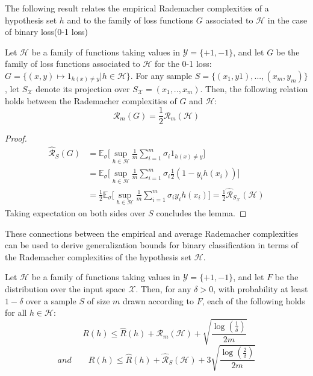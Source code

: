 The following result relates the empirical Rademacher complexities of a hypothesis set $h$ and to the family of loss functions $G$ associated to $\mathcal{H}$ in the case of binary loss(0-1 loss)
\begin{lemma}
	Let $\mathcal{H}$ be a family of functions taking values in $\mathcal{Y}=\{+1,-1\}$, and let $G$ be the family of loss functions associated to $\mathcal{H}$ for the 0-1 loss:$G=\{(x,y) \mapsto 1_{h(x)\ne y} | h\in \mathcal{H}\}$.
	For any sample $S=\{(x_1, y1),..., (x_m, y_m)\}$, let $S_{\mathcal{X}}$ denote its projection over $S_{\mathcal{X}}=(x_1,.., x_m)$. Then, the following relation holds
	between the Rademacher complexities of $G$ and $\mathcal{H}$:
	\begin{equation}
	\mathcal{R}_m(G)=\frac{1}{2} \mathcal{R}_m(\mathcal{H})
	\end{equation}
\end{lemma}
\begin{proof}
	\begin{align}
	\hat{\mathcal{R}}_S(G)&= \mathbb{E}_{\sigma} \big[\sup_{h\in \mathcal{H}}\frac{1}{m}\sum_{i=1}^{m}\sigma_i1_{h(x)\ne y}\big]\\
	&=\mathbb{E}_{\sigma} \big[\sup_{h\in \mathcal{H}}\frac{1}{m}\sum_{i=1}^{m}\sigma_i\frac{1}{2}(1-y_ih(x_i))\big]\\
	&= \frac{1}{2} \mathbb{E}_{\sigma} \big[\sup_{h\in \mathcal{H}}\frac{1}{m}\sum_{i=1}^{m}\sigma_i y_ih(x_i)\big] = \frac{1}{2}\hat{\mathcal{R}}_{S_{\mathcal{X}}}(\mathcal{H})
	\end{align}
	Taking expectation on both sides over $S$ concludes the lemma.
\end{proof}
These connections between the empirical and average Rademacher complexities can be used to derive generalization bounds for binary classification in terms of the Rademacher complexities of the hypothesis set $\mathcal{H}$.
\begin{theorem}
	Let $\mathcal{H}$ be a family of functions taking values in $\mathcal{Y}=\{+1,-1\}$, and let $F$ be the distribution over the input space $\mathcal{X}$. Then, for any $\delta>0$, with probability at least $1-\delta$ over a sample $S$ of size $m$ drawn according to $F$, each of the following holds for all $h\in \mathcal{H}$:
	\begin{equation}
	\qquad R(h) \leq \hat{R}(h) + \mathcal{R}_m(\mathcal{H}) + \sqrt{\frac{\log(\frac{1}{\delta})}{2m}}
	\end{equation}
	\begin{equation}
	and \qquad R(h) \leq \hat{R}(h) + \hat{\mathcal{R}}_{S}(\mathcal{H}) + 3\sqrt{\frac{\log(\frac{2}{\delta})}{2m}}
	\end{equation}
\end{theorem}
